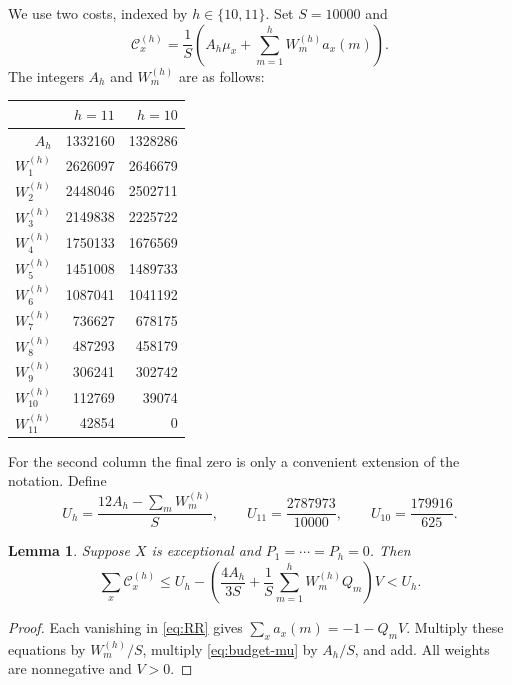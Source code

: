 \documentclass[12pt,a4paper]{article}
\numberwithin{equation}{section}
\newtheorem{lemma}[theorem]{Lemma}
\theoremstyle{definition}
\newcommand{\cost}{\mathcal C}
\begin{document}
We use two costs, indexed by \(h\in\{10,11\}\). Set \(S=10000\) and
\begin{equation}\label{eq:cost-definition}
 \cost_x^{(h)}
   =\frac1S\left(A_h\mu_x+\sum_{m=1}^h W_m^{(h)}a_x(m)\right).
\end{equation}
The integers \(A_h\) and \(W_m^{(h)}\) are as follows:
\begin{center}
\begin{tabular}{r|rr}
\toprule
 & \(h=11\)&\(h=10\)\\
\midrule
\(A_h\)&1332160&1328286\\
\(W_1^{(h)}\)&2626097&2646679\\
\(W_2^{(h)}\)&2448046&2502711\\
\(W_3^{(h)}\)&2149838&2225722\\
\(W_4^{(h)}\)&1750133&1676569\\
\(W_5^{(h)}\)&1451008&1489733\\
\(W_6^{(h)}\)&1087041&1041192\\
\(W_7^{(h)}\)&736627&678175\\
\(W_8^{(h)}\)&487293&458179\\
\(W_9^{(h)}\)&306241&302742\\
\(W_{10}^{(h)}\)&112769&39074\\
\(W_{11}^{(h)}\)&42854&0\\
\bottomrule
\end{tabular}
\end{center}
For the second column the final zero is only a convenient extension
of the notation.
Define
\begin{equation}\label{eq:cost-budgets}
 U_h=\frac{12A_h-\sum_mW_m^{(h)}}S,\qquad
 U_{11}=\frac{2787973}{10000},\qquad
 U_{10}=\frac{179916}{625}.
\end{equation}

\begin{lemma}\label{lem:global-cost}
Suppose \(X\) is exceptional and \(P_1=\cdots=P_h=0\).
Then
\begin{equation}\label{eq:global-cost}
 \sum_x\cost_x^{(h)}
 \leq U_h-
 \left(\frac{4A_h}{3S}+
       \frac1S\sum_{m=1}^hW_m^{(h)}Q_m\right)V
 <U_h.
\end{equation}
\end{lemma}

\begin{proof}
Each vanishing in \eqref{eq:RR} gives
\(\sum_xa_x(m)=-1-Q_mV\). Multiply these equations by
\(W_m^{(h)}/S\), multiply \eqref{eq:budget-mu} by \(A_h/S\),
and add. All weights are nonnegative and \(V>0\).
\end{proof}
\end{document}
